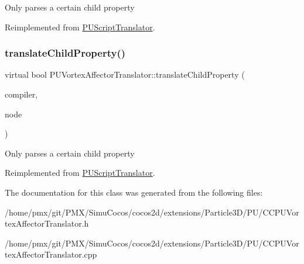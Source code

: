 Only parses a certain child property 

Reimplemented from \hyperlink{classPUScriptTranslator_a0374d83a8a04e57918975d525e0f8fe8}{P\+U\+Script\+Translator}.

\mbox{\label{classPUVortexAffectorTranslator_a64fa28da7b64de6450f190184c442b9c}} 
\subsubsection{\texorpdfstring{translate\+Child\+Property()}{translateChildProperty()}\hspace{0.1cm}{\footnotesize\ttfamily [2/2]}}
{\footnotesize\ttfamily virtual bool P\+U\+Vortex\+Affector\+Translator\+::translate\+Child\+Property (\begin{DoxyParamCaption}\item[{\hyperlink{classPUScriptCompiler}{P\+U\+Script\+Compiler} $\ast$}]{compiler,  }\item[{\hyperlink{classPUAbstractNode}{P\+U\+Abstract\+Node} $\ast$}]{node }\end{DoxyParamCaption})\hspace{0.3cm}{\ttfamily [virtual]}}

Only parses a certain child property 

Reimplemented from \hyperlink{classPUScriptTranslator_a0374d83a8a04e57918975d525e0f8fe8}{P\+U\+Script\+Translator}.



The documentation for this class was generated from the following files\+:\begin{DoxyCompactItemize}
\item 
/home/pmx/git/\+P\+M\+X/\+Simu\+Cocos/cocos2d/extensions/\+Particle3\+D/\+P\+U/C\+C\+P\+U\+Vortex\+Affector\+Translator.\+h\item 
/home/pmx/git/\+P\+M\+X/\+Simu\+Cocos/cocos2d/extensions/\+Particle3\+D/\+P\+U/C\+C\+P\+U\+Vortex\+Affector\+Translator.\+cpp\end{DoxyCompactItemize}
